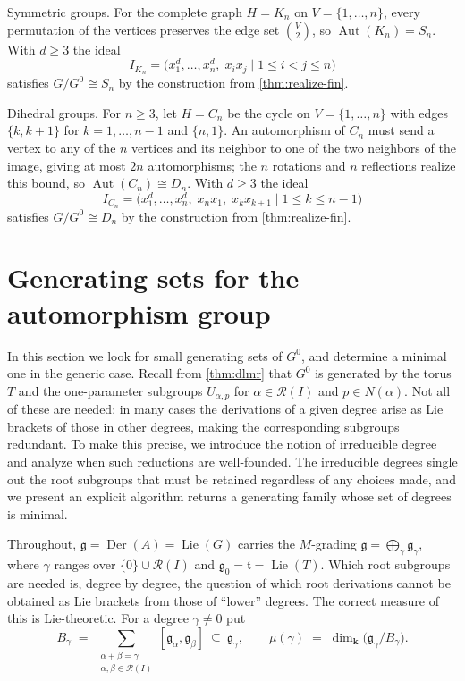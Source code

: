 \documentclass[11pt,letterpaper,reqno]{amsart}
\theoremstyle{remark}
\theoremstyle{definition}
\newcommand{\KK}[0]{\ensuremath{\mathbf{k}}}
\newcommand{\Aut}[0]{\ensuremath{\operatorname{Aut}}}
\newcommand{\Der}[0]{\ensuremath{\operatorname{Der}}}
\begin{document}
Symmetric groups. For the complete graph $H=K_n$ on $V=\{1,\dots,n\}$,
every permutation of the vertices preserves the edge set $\binom{V}{2}$, so
$\Aut(K_n)=S_n$. With $d\geq 3$ the ideal
$$
I_{K_n}=\big(x_1^d,\dots,x_n^d,\; x_ix_j\mid 1\le i<j\le n\big)
$$
satisfies $G/G^0\cong S_n$ by the construction from \cref{thm:realize-fin}.

Dihedral groups. For $n\geq 3$, let $H=C_n$ be the cycle on
$V=\{1,\dots,n\}$ with edges $\{k,k+1\}$ for $k=1,\dots,n-1$ and $\{n,1\}$.
An automorphism of $C_n$ must send a vertex to any of the $n$ vertices and its
neighbor to one of the two neighbors of the image, giving at most $2n$
automorphisms; the $n$ rotations and $n$ reflections realize this bound, so
$\Aut(C_n)\cong D_n$. With $d\geq 3$ the ideal
$$
I_{C_n}=\big(x_1^d,\dots,x_n^d,\; x_nx_1,\; x_kx_{k+1}\mid 1\le k\le n-1\big)
$$
satisfies $G/G^0\cong D_n$ by the construction from \cref{thm:realize-fin}.



\section{Generating sets for the automorphism group}\label{sec:generators}
In this section we look for small generating sets of $G^0$, and determine a minimal one in the generic case. Recall from \cref{thm:dlmr} that $G^0$ is generated by the torus $T$ and the one-parameter subgroups $U_{\alpha,p}$ for $\alpha\in\mathcal R(I)$ and $p\in N(\alpha)$. Not all of these are needed: in many cases the derivations of a given degree arise as Lie brackets of those in other degrees, making the corresponding subgroups redundant. To make this precise, we introduce the notion of irreducible degree and analyze when such reductions are well-founded. The irreducible degrees single out the root subgroups that must be retained regardless of any choices made, and we present an explicit algorithm returns a generating family whose set of degrees is minimal.

Throughout, $\mathfrak g=\Der(A)=\operatorname{Lie}(G)$ carries the $M$-grading
$\mathfrak g=\bigoplus_{\gamma}\mathfrak g_\gamma$, where $\gamma$ ranges over
$\{0\}\cup\mathcal R(I)$ and $\mathfrak g_0=\mathfrak t=\operatorname{Lie}(T)$.
Which root subgroups are needed is, degree by degree, the question of which root
derivations cannot be obtained as Lie brackets from those of ``lower'' degrees. The correct measure
of this is Lie-theoretic. For a degree $\gamma\neq 0$ put
$$
  B_\gamma \;=\; \sum_{\substack{\alpha+\beta=\gamma\\ \alpha,\beta\in\mathcal R(I)}}
  [\mathfrak g_\alpha,\mathfrak g_\beta]\ \subseteq\ \mathfrak g_\gamma,
  \qquad
  \mu(\gamma) \;=\; \dim_\KK\bigl(\mathfrak g_\gamma/B_\gamma\bigr).
$$
\end{document}
